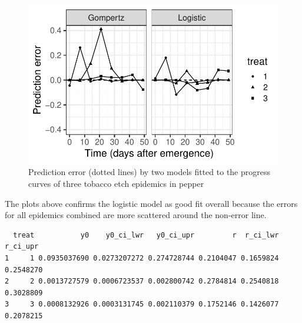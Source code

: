 \documentclass[
  letterpaper,
  DIV=11,
  numbers=noendperiod]{scrreprt}
\newenvironment{Shaded}{\begin{snugshade}}{\end{snugshade}}
\newcommand{\FunctionTok}[1]{\textcolor[rgb]{0.28,0.35,0.67}{#1}}
\newcommand{\NormalTok}[1]{\textcolor[rgb]{0.00,0.23,0.31}{#1}}
\newcommand{\SpecialCharTok}[1]{\textcolor[rgb]{0.37,0.37,0.37}{#1}}
\newcommand{\StringTok}[1]{\textcolor[rgb]{0.13,0.47,0.30}{#1}}
\begin{document}
\begin{figure}[H]

{\centering \includegraphics{temporal-fitting_files/figure-pdf/fig-error-1.pdf}

}

\caption{\label{fig-error}Prediction error (dotted lines) by two models
fitted to the progress curves of three tobacco etch epidemics in pepper}

\end{figure}

The plots above confirms the logistic model as good fit overall because
the errors for all epidemics combined are more scattered around the
non-error line.

\begin{Shaded}
\end{Shaded}

\begin{verbatim}
  treat           y0    y0_ci_lwr   y0_ci_upr         r  r_ci_lwr  r_ci_upr
1     1 0.0935037690 0.0273207272 0.274728744 0.2104047 0.1659824 0.2548270
2     2 0.0013727579 0.0006723537 0.002800742 0.2784814 0.2540818 0.3028809
3     3 0.0008132926 0.0003131745 0.002110379 0.1752146 0.1426077 0.2078215
\end{verbatim}
\end{document}
